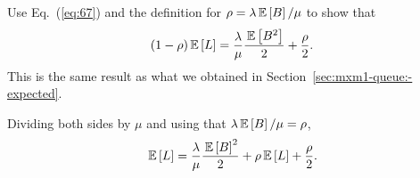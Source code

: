 \begin{question}
  Use Eq.~(\ref{eq:67}) and the definition for
  $\rho=\lambda \,\mathbb{E}\left[B\right]/\mu$ to show that
\begin{equation*}
(1- \rho) \,\mathbb{E}\left[L\right] = \frac{\lambda}\mu \frac{\,\mathbb{E}\left[B^2\right]}2 + \frac\rho2.
\end{equation*}
This is the same result as what we obtained in
Section~\ref{sec:mxm1-queue:-expected}.  
\begin{solution}
Dividing both sides by $\mu$ and using that $\lambda \,\mathbb{E}\left[B\right]/\mu = \rho$, 
\begin{equation*}
  \,\mathbb{E}\left[L\right] = \frac{\lambda}{\mu}  \frac{\,\mathbb{E}\left[B\right]^2 }2 + \rho \,\mathbb{E}\left[L\right] + \frac\rho2.
\end{equation*}
\end{solution}
\end{question}


